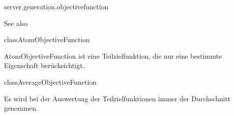 \begin{texdocpackage}{server.generation.objectivefunction}
\label{texdoclet:edu.kit.informatik.studyplan.server.generation.objectivefunction}

\begin{texdocsees}{See also}
\end{texdocsees}
\begin{texdocclass}{class}{AtomObjectiveFunction}
\label{texdoclet:edu.kit.informatik.studyplan.server.generation.objectivefunction.AtomObjectiveFunction}
\begin{texdocclassintro}
AtomObjectiveFunction ist eine Teilzielfunktion, die nur eine bestimmte Eigenschaft
 berücksichtigt.\end{texdocclassintro}
\begin{texdocclassconstructors}
\end{texdocclassconstructors}
\begin{texdocclassmethods}
\end{texdocclassmethods}
\end{texdocclass}


\begin{texdocclass}{class}{AverageObjectiveFunction}
\label{texdoclet:edu.kit.informatik.studyplan.server.generation.objectivefunction.AverageObjectiveFunction}
\begin{texdocclassintro}
Es wird bei der Auswertung der Teilzielfunktionen immer der Durchschnitt genommen.\end{texdocclassintro}
\begin{texdocclassconstructors}
\end{texdocclassconstructors}
\begin{texdocclassmethods}
\end{texdocclassmethods}
\end{texdocclass}



\end{texdocpackage}
